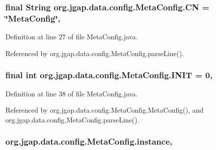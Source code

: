 \hypertarget{classorg_1_1jgap_1_1data_1_1config_1_1_meta_config_a84ef3b26d6d1069dce136cf95b5b2fd9}{
\subsubsection[{C\-N}]{\setlength{\rightskip}{0pt plus 5cm}final String org.\-jgap.\-data.\-config.\-Meta\-Config.\-C\-N = \char`\"{}Meta\-Config\char`\"{}\hspace{0.3cm}{\ttfamily [static]}, {\ttfamily [private]}}}\label{classorg_1_1jgap_1_1data_1_1config_1_1_meta_config_a84ef3b26d6d1069dce136cf95b5b2fd9}


Definition at line 27 of file Meta\-Config.\-java.



Referenced by org.\-jgap.\-data.\-config.\-Meta\-Config.\-parse\-Line().

\hypertarget{classorg_1_1jgap_1_1data_1_1config_1_1_meta_config_a69e6171ae60590befec61ab139eb2962}{
\subsubsection[{I\-N\-I\-T}]{\setlength{\rightskip}{0pt plus 5cm}final int org.\-jgap.\-data.\-config.\-Meta\-Config.\-I\-N\-I\-T = 0\hspace{0.3cm}{\ttfamily [static]}, {\ttfamily [private]}}}\label{classorg_1_1jgap_1_1data_1_1config_1_1_meta_config_a69e6171ae60590befec61ab139eb2962}


Definition at line 38 of file Meta\-Config.\-java.



Referenced by org.\-jgap.\-data.\-config.\-Meta\-Config.\-Meta\-Config(), and org.\-jgap.\-data.\-config.\-Meta\-Config.\-parse\-Line().

\hypertarget{classorg_1_1jgap_1_1data_1_1config_1_1_meta_config_a800bdf701204298e4e8474faf5e7d76d}{
\subsubsection[{instance}]{ org.\-jgap.\-data.\-config.\-Meta\-Config.\-instance\hspace{0.3cm}{\ttfamily [static]}, {\ttfamily [private]}}}\label{classorg_1_1jgap_1_1data_1_1config_1_1_meta_config_a800bdf701204298e4e8474faf5e7d76d}


